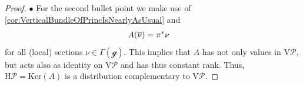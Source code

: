 \documentclass[reqno,a4paper,oneside]{amsart}
\theoremstyle{plain}
\theoremstyle{remark}
\theoremstyle{definition}
\begin{document}
\begin{proof}
$\bullet$ For the second bullet point we make use of \ref{cor:VerticalBundleOfPrincIsNearlyAsUsual} and
\begin{align*}
A\mleft( \overline{\nu} \mright)
&=
\pi^*\nu
\end{align*}
for all (local) sections $\nu \in \Gamma(\mathcal{g})$. This implies that $A$ has not only values in $\mathrm{V}\mathcal{P}$, but acts also as identity on $\mathrm{V}\mathcal{P}$ and has thus constant rank. Thus, $\mathrm{H}\mathcal{P} = \mathrm{Ker}(A)$ is a distribution complementary to $\mathrm{V}\mathcal{P}$.

\end{proof}
\end{document}
